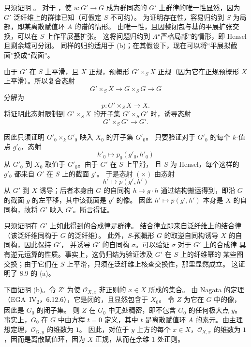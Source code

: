 只须证明 。
对于 ，使 \(u:G'\to G\) 成为群同态的
\(G'\) 上群律的唯一性显然，因为 \(G'\) 泛纤维上的群律已知（可假定 \(S\) 不可约）。
为证明存在性，容易归约到 \(S\) 为局部，即某离散赋值环 \(A\) 的谱的情形。
由唯一性，且因整闭包与基的平展扩张交换，可以在 \(S\) 上作平展基扩张。
这将问题归约到 \(A\)“严格局部”的情形，即 Hensel 且剩余域可分闭。
同样的归约适用于 (b)；在其假设下，现在可以将“平展拟截面”换成“截面”。

由于 \(G'\) 在 \(S\) 上平滑，且 \(X\) 正规，预概形 \(G'\times_S X\)
正规（因为它在正规预概形 \(X\) 上平滑）。所以复合态射
\[
  G'\times_S X\longrightarrow G\times_S G\longrightarrow G
\]
分解为
\[
  p:G'\times_S X\longrightarrow X.
\]
将证明此态射限制到 \(G'\times_S X\) 的开子集 \(G'\times_S G'\) 时，诱导态射
\[
  G'\times_S G'\longrightarrow G'.
\]

因此只须证明 \(G'_0\times_k G'_0\) 映入 \(X_0\) 的开子集 \(G'_0\)。
只要验证对于 \(G'_0\) 的每个 \(k\)-值点 \(g'_0\)，态射
\[
  \tag{\(\times\)}\label{sga3:x:lemma:8-9:equation:times}
  h'_0\longmapsto p_0(g'_0,h'_0)
\]
从 \(G'_0\) 到 \(X_0\) 取值于 \(G'_0\)。由于 \(G'\) 在 \(S\) 上平滑，
且 \(S\) 为 Hensel，每个这样的 \(g'_0\) 都来自 \(G'\) 在 \(S\) 上的截面 \(g'\)。
于是态射 \((\times)\) 由态射
\[
  h'\longmapsto p(g',h')
\]
从 \(G'\) 到 \(X\) 诱导；后者本身由 \(G\) 的自同构 \(h\mapsto g\cdot h\)
通过结构搬运得到，即沿 \(G\) 的截面 \(g\) 的左平移，其中该截面是 \(g'\) 的像。
因此 \(h'\mapsto p(g',h')\) 本身是 \(X\) 的自同构，故将 \(G'\) 映入 \(G'\)。断言得证。

只须证明在 \(G'\) 上如此得到的合成律是群律。
结合律立即来自泛纤维上的结合律（该泛纤维同构于 \(G\) 的泛纤维）。
此外，\(S\)-预概形 \(G\) 的取逆自同构诱导 \(X\) 的自同构，因此保持 \(G'\)，
并诱导 \(G'\) 的自同构 \(\sigma\)。可以验证 \(\sigma\) 对于 \(G'\) 上的合成律
具有逆元运算的性质。事实上，这仍归结为验证涉及 \(G'\) 在 \(S\) 上的纤维幂的
某些图交换；由于它们在 \(S\) 上平滑，只须在泛纤维上核查交换性，那里显然成立。
这证明了 8.9 的 (a)。

下面证明 (b)。令 \(Z'\) 为使 \(\mathcal O_{X,x}\) 非正则的 \(x\in X\) 所成的集合。
由 Nagata 的定理（EGA~IV\textsubscript{2}，6.12.6），它是闭的，且显然包含于 \(X_0\)。
令 \(Z\) 为它在 \(G\) 中的像，因此是 \(G_0\) 的闭子集。
则 \(Z\) 在 \(G_0\) 中无处稠密，即不包含 \(G_0\) 的任何极大点 \(y\)。
事实上，\(G_0\) 在 \(G\) 中由方程 \(t=0\) 定义，其中 \(t\) 是离散赋值环
\(A\) 的素元。由主理想定理，\(\mathcal O_{G,y}\) 的维数为 \(1\)。
因此，对位于 \(y\) 上方的每个 \(x\in X\)，\(\mathcal O_{X,x}\) 的维数为
\(1\)，因而是离散赋值环，因为 \(X\) 正规，从而在余维 \(1\) 处正则。

